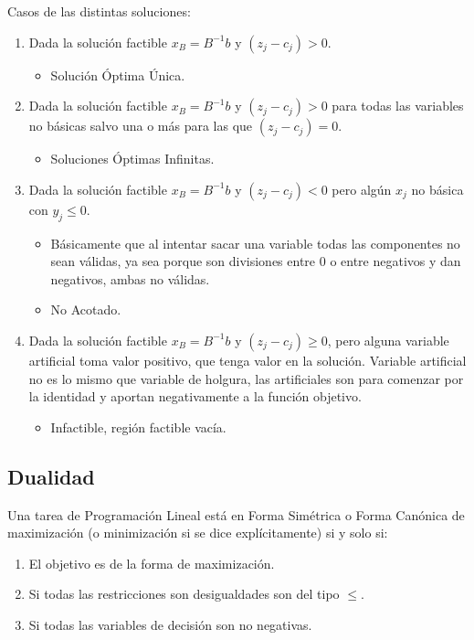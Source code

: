 \documentclass[12pt, twoside, openright]{report} %
\begin{document}
  Casos de las distintas soluciones: 
 \begin{enumerate}
	 \item Dada la solución factible
	 \(x_B=B^{-1}b\) y \((z_j-c_j) > 0\). 
	 \begin{itemize}
		 \item Solución Óptima Única. 
	 \end{itemize}
	 \item Dada la solución factible \(x_B=B^{-1}b\) y \((z_j-c_j) > 0\) para todas
	 las variables no básicas salvo una o más para las que
	 \((z_j-c_j) = 0\).
	 \begin{itemize}
		\item Soluciones Óptimas Infinitas. 
	\end{itemize}
	 \item Dada la solución factible \(x_B=B^{-1}b\) y \((z_j-c_j) < 0\) pero algún \(x_j\) no
	 básica con \(y_j \leq 0\).
	 \begin{itemize}
		 \item Básicamente que al intentar sacar una
		 variable todas las componentes no sean válidas, ya sea porque son
		 divisiones entre 0 o entre negativos y dan negativos, ambas no
		 válidas. 
		 \item No Acotado. 
	 \end{itemize}
	 
	 \item Dada la solución factible \(x_B=B^{-1}b\) y
	 \((z_j-c_j) \geq 0\), pero alguna variable artificial toma valor
	 positivo, que tenga valor en la solución. Variable artificial no es
	 lo mismo que variable de holgura, las artificiales son para comenzar
	 por la identidad y aportan negativamente a la función objetivo.
	 \begin{itemize}
		\item Infactible, región factible vacía.
	\end{itemize} 	 
 \end{enumerate} 
\pagebreak
\subsection{Dualidad}

Una tarea de Programación Lineal está en Forma Simétrica o Forma
Canónica de maximización (o minimización si se dice explícitamente) si
y solo si: 

\begin{enumerate}
	\item El objetivo es de la forma de maximización.
	\item Si todas las restricciones son desigualdades son del tipo $\leq$.
	\item Si todas las variables de decisión son no negativas.
\end{enumerate}
\end{document}
